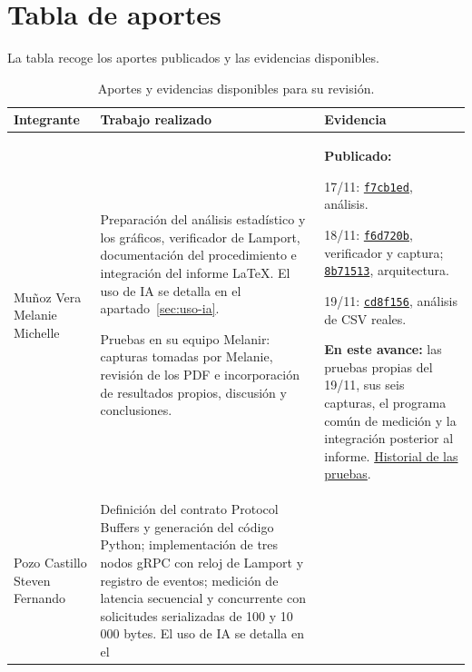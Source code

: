 \section{Tabla de aportes}
\label{sec:aportes}

La tabla recoge los aportes publicados y las evidencias disponibles.

\begin{table}[htbp]
\centering\small
\caption{Aportes y evidencias disponibles para su revisión.}
\label{tab:aportes}
\renewcommand{\arraystretch}{1.15}
\begin{tabularx}{\linewidth}{>{\raggedright\arraybackslash}p{2.6cm}>{\raggedright\arraybackslash}X>{\raggedright\arraybackslash}p{4.8cm}}
\toprule
Integrante & Trabajo realizado & Evidencia \\
\midrule
Muñoz Vera Melanie Michelle
& Preparación del análisis estadístico y los gráficos, verificador
de Lamport, documentación del procedimiento e integración del informe
LaTeX. El uso de IA se detalla en el apartado~\ref{sec:uso-ia}.
\par Pruebas en su equipo Melanir:
capturas tomadas por Melanie, revisión de los PDF e incorporación
de resultados propios, discusión y conclusiones.
& \textbf{Publicado:}
\par 17/11: \href{https://github.com/iMouraad/PE-U1-MPZ/commit/f7cb1edbd9493d57c989a1cf0675eb7d19c0a8c7}{\texttt{f7cb1ed}}, análisis.
\par 18/11: \href{https://github.com/iMouraad/PE-U1-MPZ/commit/f6d720b9384bb439648a83e43085e53c608e8f24}{\texttt{f6d720b}}, verificador y captura;
\href{https://github.com/iMouraad/PE-U1-MPZ/commit/8b71513859cf321cc769e77babbf85aa14f0af1b}{\texttt{8b71513}}, arquitectura.
\par 19/11: \href{https://github.com/iMouraad/PE-U1-MPZ/commit/cd8f1564ffd186764369966a73be11144941897e}{\texttt{cd8f156}}, análisis de CSV reales.
\par \textbf{En este avance:} las pruebas propias del 19/11, sus seis capturas,
el programa común de medición y la integración posterior al informe.
\href{https://github.com/iMouraad/PE-U1-MPZ/commits/main/data/melanie/2026-11-19}{Historial de las pruebas}. \\
\addlinespace
Pozo Castillo Steven Fernando
& Definición del contrato Protocol Buffers y generación del código Python;
implementación de tres nodos gRPC con reloj de Lamport y registro de
eventos; medición de latencia secuencial y concurrente con solicitudes
serializadas de 100 y 10\,000 bytes. El uso de IA se detalla en el

\end{tabularx}
\end{table}
